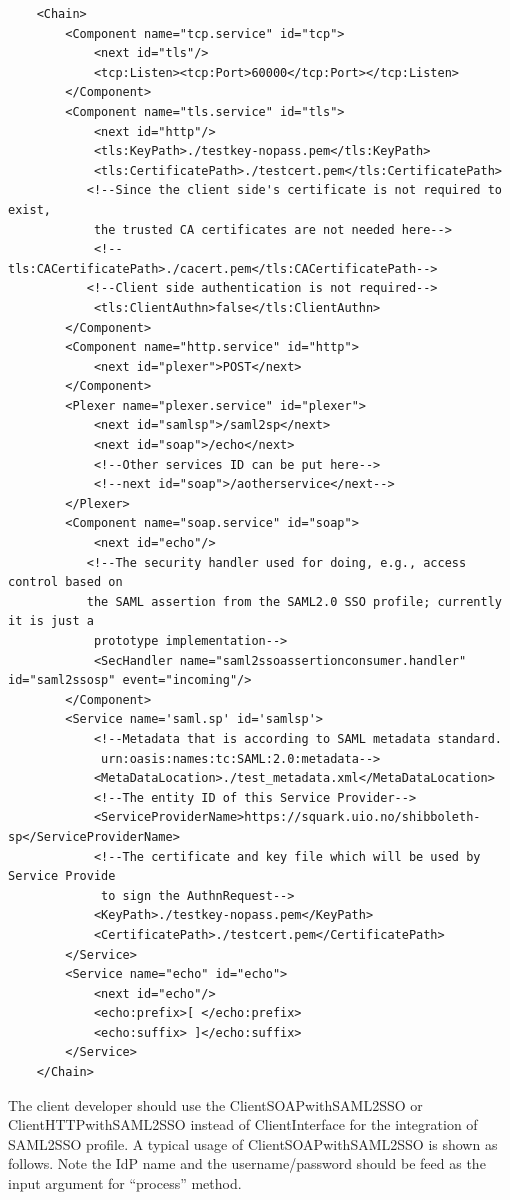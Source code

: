 \documentclass{article}                            %
\begin{document}
\begin{verbatim}
    <Chain>
        <Component name="tcp.service" id="tcp">
            <next id="tls"/>
            <tcp:Listen><tcp:Port>60000</tcp:Port></tcp:Listen>
        </Component>
        <Component name="tls.service" id="tls">
            <next id="http"/>
            <tls:KeyPath>./testkey-nopass.pem</tls:KeyPath>
            <tls:CertificatePath>./testcert.pem</tls:CertificatePath>
           <!--Since the client side's certificate is not required to exist,
            the trusted CA certificates are not needed here-->
            <!--tls:CACertificatePath>./cacert.pem</tls:CACertificatePath-->
           <!--Client side authentication is not required-->
            <tls:ClientAuthn>false</tls:ClientAuthn>
        </Component>
        <Component name="http.service" id="http">
            <next id="plexer">POST</next>
        </Component>
        <Plexer name="plexer.service" id="plexer">
            <next id="samlsp">/saml2sp</next>
            <next id="soap">/echo</next>
            <!--Other services ID can be put here-->
            <!--next id="soap">/aotherservice</next-->
        </Plexer>
        <Component name="soap.service" id="soap">
            <next id="echo"/>
           <!--The security handler used for doing, e.g., access control based on
           the SAML assertion from the SAML2.0 SSO profile; currently it is just a
            prototype implementation-->
            <SecHandler name="saml2ssoassertionconsumer.handler" id="saml2ssosp" event="incoming"/>
        </Component>
        <Service name='saml.sp' id='samlsp'>
            <!--Metadata that is according to SAML metadata standard.
             urn:oasis:names:tc:SAML:2.0:metadata-->
            <MetaDataLocation>./test_metadata.xml</MetaDataLocation>
            <!--The entity ID of this Service Provider-->
            <ServiceProviderName>https://squark.uio.no/shibboleth-sp</ServiceProviderName>
            <!--The certificate and key file which will be used by Service Provide
             to sign the AuthnRequest-->
            <KeyPath>./testkey-nopass.pem</KeyPath>
            <CertificatePath>./testcert.pem</CertificatePath>
        </Service>
        <Service name="echo" id="echo">
            <next id="echo"/>
            <echo:prefix>[ </echo:prefix>
            <echo:suffix> ]</echo:suffix>
        </Service>
    </Chain>
\end{verbatim}

    The client developer should use the ClientSOAPwithSAML2SSO  or ClientHTTPwithSAML2SSO instead of ClientInterface for the integration of SAML2SSO profile. A typical usage of ClientSOAPwithSAML2SSO is shown as follows. Note the IdP name and the username/password should be feed as the input argument for ``process'' method.
\end{document}
